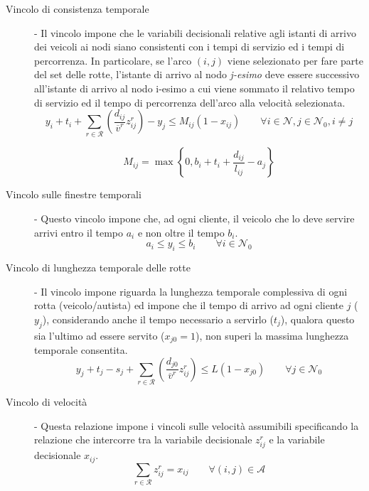 \begin{description}
			\item[Vincolo di consistenza temporale]-
				Il vincolo impone che le variabili decisionali relative agli istanti di arrivo dei veicoli ai nodi siano consistenti con i tempi di servizio ed i tempi di percorrenza. In particolare, se l’arco $(i,j)$ viene selezionato per fare parte del set delle rotte, l’istante di arrivo al nodo \emph{j-esimo} deve essere successivo all’istante di arrivo al nodo i-esimo a cui viene sommato il relativo tempo di servizio ed il tempo di percorrenza dell’arco alla velocità selezionata.
				\begin{equation}
					\label{eq:temporal_consistency}
					y_i + t_i + 
					\sum_{r \in \mathcal{R}} \left(\frac{d_{ij}}{\overline v^r} z_{ij}^{r}\right) - 
					y_j \leq
					M_{ij}(1 - x_{ij})
					\qquad
					\forall i \in \mathcal{N}, j \in \mathcal{N}_0, i \neq j
				\end{equation}

				$$M_{ij} = \max \left\{ 0, b_i + t_i + \frac{d_{ij}} {l_{ij}} - a_j\right\}$$

			\item[Vincolo sulle finestre temporali]-
				Questo vincolo impone che, ad ogni cliente, il veicolo che lo deve servire arrivi entro il tempo $a_i$ e non oltre il tempo $b_i$.
				\begin{equation}
					\label{eq:time_windows}
					a_i \leq y_i \leq b_i
					\qquad
					\forall i \in \mathcal{N}_0
				\end{equation}

			\item[Vincolo di lunghezza temporale delle rotte]-
				Il vincolo impone riguarda la lunghezza temporale complessiva di ogni rotta (veicolo/autista) ed impone che il tempo di arrivo ad ogni cliente $j$ ($y_j$), considerando anche il tempo necessario a servirlo ($t_j$), qualora questo sia l'ultimo ad essere servito ($x_{j0}=1$), non superi la massima lunghezza temporale consentita.
				\begin{equation}
					\label{eq:total_temporal_constraint}
					y_j + t_j - s_j +
					\sum_{r \in \mathcal{R}}\left(\frac{d_{j0}}{\overline v^r}z_{ij}^{r}\right)
					\leq L(1-x_{j0})
					\qquad 
					\forall j \in \mathcal{N}_0
				\end{equation} 

			\item[Vincolo di velocità]-
				Questa relazione impone i vincoli sulle velocità assumibili specificando la relazione che intercorre tra la variabile decisionale $z_{ij}^r$ e la variabile decisionale $x_{ij}$.
				\begin{equation}
					\label{eq:speed_level_constraint}
					\sum_{r \in \mathcal{R}}z_{ij}^{r} = x_{ij} 
					\qquad
					\forall (i,j) \in \mathcal{A}
				\end{equation}
		\end{description}

